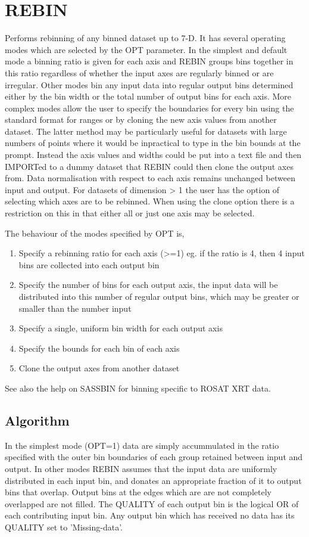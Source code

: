 \documentclass{book}
\renewcommand{\_}{{\tt\char'137}}     %
\begin{document}
\section{REBIN}
Performs rebinning of any binned dataset up to 7-D. It has
several operating modes which are selected by the OPT parameter.
In the simplest and default mode a binning ratio is given
for each axis and REBIN groups bins together in this ratio
regardless of whether the input axes are regularly binned or
are irregular. Other modes bin any input data into regular
output bins determined either by the bin width or the total
number of output bins for each axis. More complex modes
allow the user to specify the boundaries for every bin using
the standard format for ranges or by cloning the new axis
values from another dataset. The latter method may be
particularly useful for datasets with large numbers of points
where it would be inpractical to type in the bin bounds at the
prompt. Instead the axis values and widths could be put into
a text file and then IMPORTed to a dummy dataset that REBIN
could then clone the output axes from. Data normalisation with
respect to each axis remains unchanged between input and output.
For datasets of dimension > 1 the user has the option of selecting
which axes are to be rebinned. When using the clone option there
is a restriction on this in that either all or just one axis may
be selected.

The behaviour of the modes specified by OPT is,

\begin{enumerate}
\item Specify a rebinning ratio for each axis (>=1)
eg. if the ratio is 4, then 4 input bins are
collected into each output bin
\item Specify the number of bins for each output
axis, the input data will be distributed into
this number of regular output bins, which may
be greater or smaller than the number input
\item Specify a single, uniform bin width for each
output axis
\item Specify the bounds for each bin of each axis
\item Clone the output axes from another dataset
\end{enumerate}
See also the help on SASSBIN for binning specific to
ROSAT XRT data.

\subsection{Algorithm}
In the simplest mode (OPT=1) data are simply accummulated in
the ratio specified with the outer bin boundaries of each
group retained between input and output. In other modes
REBIN assumes that the input data are uniformly distributed in
each input bin, and donates an appropriate fraction of it to
output bins that overlap. Output bins at the edges which are
are not completely overlapped are not filled. The QUALITY of
each output bin is the logical OR of each contributing input bin.
Any output bin which has received no data has its QUALITY set
to 'Missing-data'.
\end{document}
